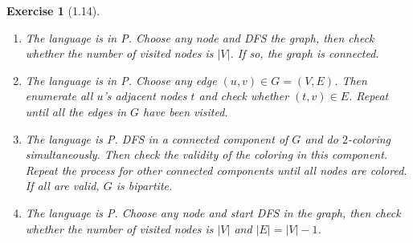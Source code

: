 \documentclass[a4paper]{article}
\newtheorem*{exercise}{Exercise}
\begin{document}
\begin{exercise}[1.14]
\begin{enumerate}		
	\item[\textbf{(a)}] 
		The language is in P.
		Choose any node and DFS the graph, then check whether the number of visited nodes is $|V|$. 
        If so, the graph is connected.
		\item[\textbf{(b)}] 
		The language is in P.
        Choose any edge $(u,v)\in G=(V,E)$. Then enumerate all $u$'s adjacent nodes $t$ and check whether $(t,v)\in E$. 
        Repeat until all the edges in $G$ have been visited.
		\item[\textbf{(c)}] 
		The language is P.
		DFS in a connected component of $G$ and do $2$-coloring simultaneously.
        Then check the validity of the coloring in this component. 
        Repeat the process for other connected components until all nodes are colored.
        If all are valid, $G$ is bipartite. 
		\item[\textbf{(d)}] 
		The language is P.
        Choose any node and start DFS in the graph, then
        check whether the number of visited nodes is $|V|$ and $|E|=|V|-1$.
\end{enumerate}
\end{exercise}
\end{document}
